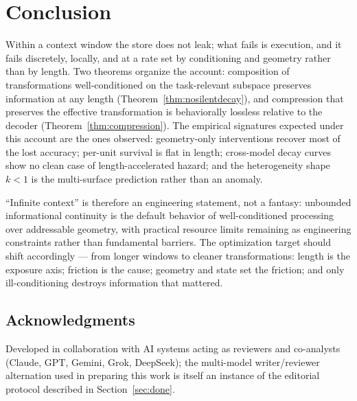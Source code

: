 \documentclass[11pt]{article}
\theoremstyle{remark}
\begin{document}
\section{Conclusion}
\label{sec:conclusion}

Within a context window the store does not leak; what fails is execution, and it fails
discretely, locally, and at a rate set by conditioning and geometry rather than by
length. Two theorems organize the account: composition of transformations
well-conditioned on the task-relevant subspace preserves information at any length
(Theorem~\ref{thm:nosilentdecay}), and compression that preserves the effective
transformation is behaviorally lossless relative to the decoder
(Theorem~\ref{thm:compression}). The empirical signatures expected under this account
are the ones observed: geometry-only interventions recover most of the lost accuracy;
per-unit survival is flat in length; cross-model decay curves show no clean case of
length-accelerated hazard; and the heterogeneity shape $k < 1$ is the multi-surface
prediction rather than an anomaly.

``Infinite context'' is therefore an engineering statement, not a fantasy: unbounded
informational continuity is the default behavior of well-conditioned processing over
addressable geometry, with practical resource limits remaining as engineering
constraints rather than fundamental barriers. The optimization target should shift
accordingly --- from longer windows to cleaner transformations:
length is the exposure axis; friction is the cause; geometry and state set the
friction; and only ill-conditioning destroys information that mattered.

\subsection*{Acknowledgments}
Developed in collaboration with AI systems acting as reviewers and co-analysts
(Claude, GPT, Gemini, Grok, DeepSeek); the multi-model writer/reviewer alternation
used in preparing this work is itself an instance of the editorial protocol described
in Section~\ref{sec:done}.
\end{document}

